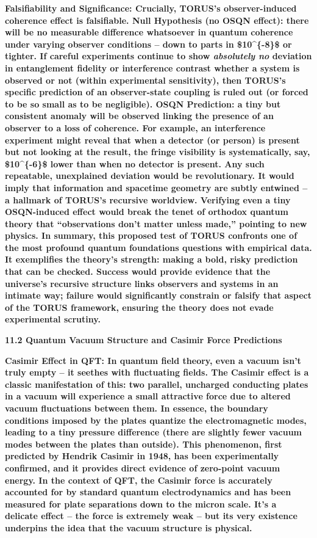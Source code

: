 \documentclass[]{article}
\begin{document}
\textbf{Falsifiability and Significance: Crucially, TORUS's
observer-induced coherence effect is falsifiable. Null Hypothesis (no
OSQN effect): there will be no measurable difference whatsoever in
quantum coherence under varying observer conditions -- down to parts in
\$10\^{}\{-8\}\$ or tighter. If careful experiments continue to show
\emph{absolutely no} deviation in entanglement fidelity or interference
contrast whether a system is observed or not (within experimental
sensitivity), then TORUS's specific prediction of an observer-state
coupling is ruled out (or forced to be so small as to be negligible).
OSQN Prediction: a tiny but consistent anomaly will be observed linking
the presence of an observer to a loss of coherence. For example, an
interference experiment might reveal that when a detector (or person) is
present but not looking at the result, the fringe visibility is
systematically, say, \$10\^{}\{-6\}\$ lower than when no detector is
present. Any such repeatable, unexplained deviation would be
revolutionary. It would imply that information and spacetime geometry
are subtly entwined -- a hallmark of TORUS's recursive worldview.
Verifying even a tiny OSQN-induced effect would break the tenet of
orthodox quantum theory that ``observations don't matter unless made,''
pointing to new physics. In summary, this proposed test of TORUS
confronts one of the most profound quantum foundations questions with
empirical data. It exemplifies the theory's strength: making a bold,
risky prediction that can be checked. Success would provide evidence
that the universe's recursive structure links observers and systems in
an intimate way; failure would significantly constrain or falsify that
aspect of the TORUS framework, ensuring the theory does not evade
experimental scrutiny.}

\textbf{11.2 Quantum Vacuum Structure and Casimir Force Predictions}

\textbf{Casimir Effect in QFT: In quantum field theory, even a vacuum
isn't truly empty -- it seethes with fluctuating fields. The Casimir
effect is a classic manifestation of this: two parallel, uncharged
conducting plates in a vacuum will experience a small attractive force
due to altered vacuum fluctuations between them. In essence, the
boundary conditions imposed by the plates quantize the electromagnetic
modes, leading to a tiny pressure difference (there are slightly fewer
vacuum modes between the plates than outside). This phenomenon, first
predicted by Hendrik Casimir in 1948, has been experimentally confirmed,
and it provides direct evidence of zero-point vacuum energy. In the
context of QFT, the Casimir force is accurately accounted for by
standard quantum electrodynamics and has been measured for plate
separations down to the micron scale. It's a delicate effect -- the
force is extremely weak -- but its very existence underpins the idea
that the vacuum structure is physical.}
\end{document}
